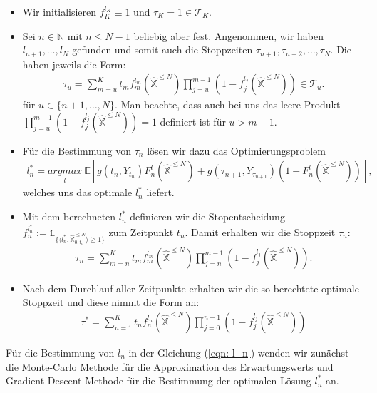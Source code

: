 \documentclass[12pt,titlepage,headsepline]{article}
\begin{document}
      \begin{itemize}
        \item Wir initialisieren $f_K^{l_K} \equiv 1$ und $\tau_K=1 \in \mathcal{T}_K$.
        \item Sei $n \in \mathbb{N}$ mit $n \leq N-1$ beliebig aber fest. Angenommen, wir haben $l_{n+1},\ldots,l_N$ gefunden und somit auch die Stoppzeiten $\tau_{n+1},\tau_{n+2},\ldots,\tau_{N}$. Die haben jeweils die Form:
        \begin{align*}
          \tau_{u} = \sum_{m=u}^K t_mf_m^{l_m}(\hat{\mathbb{X}}^{\leq N})\prod_{j=u}^{m-1}(1-f_j^{l_j}(\hat{\mathbb{X}}^{\leq N})) \in \mathcal{T}_{u}.
        \end{align*}
        für $u \in \{n+1,\ldots,N\}$. Man beachte, dass auch bei uns das leere Produkt $\prod_{j=u}^{m-1}(1-f_j^{l_j}(\hat{\mathbb{X}}^{\leq N})) = 1$ definiert ist für $u>m-1$.
        \item Für die Bestimmung von $\tau_n$ lösen wir dazu das Optimierungsproblem
        \begin{align}\label{eqn: l_n}
          l_n^* = \underset{l}{argmax} \ \mathbb{E}[g(t_n, Y_{t_n})F_n^l(\hat{\mathbb{X}}^{\leq N})+g(\tau_{n+1},Y_{\tau_{n+1}})(1-F_n^l(\hat{\mathbb{X}}^{\leq N})) ],
        \end{align}
        welches uns das optimale $l_n^*$ liefert.
        \item Mit dem berechneten $l_n^*$ definieren wir die Stopentscheidung $f_n^{l_n^*} := \mathds{1}_{ \{ \langle l_n^*, \hat{\mathbb{X}}^{\leq N}_{0,t_n}  \rangle \geq 1 \} }$ zum Zeitpunkt $t_n$. Damit erhalten wir die Stoppzeit $\tau_n$:
        \begin{align*}
          \tau_{n} = \sum_{m=n}^K t_mf_m^{l_m}(\hat{\mathbb{X}}^{\leq N})\prod_{j=n}^{m-1}(1-f_j^{l_j}(\hat{\mathbb{X}}^{\leq N})).
        \end{align*}
        \item Nach dem Durchlauf aller Zeitpunkte erhalten wir die so berechtete optimale Stoppzeit und diese nimmt die Form an:
        \begin{align*}
          \tau^* = \sum_{n=1}^K t_nf_n^{l_n}(\hat{\mathbb{X}}^{\leq N})\prod_{j=0}^{n-1}(1-f_j^{l_j}(\hat{\mathbb{X}}^{\leq N}))
        \end{align*}
      \end{itemize}
      Für die Bestimmung von $l_n$ in der Gleichung (\ref{eqn: l_n}) wenden wir zunächst die Monte-Carlo Methode für die Approximation des Erwartungswerts und Gradient Descent Methode für die Bestimmung der optimalen Lösung $l^*_n$ an.
\end{document}
